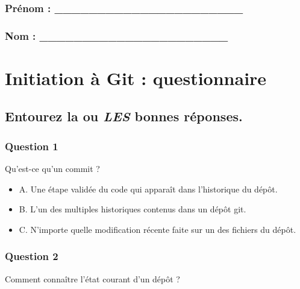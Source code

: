 \documentclass[]{article}
\date{}
\providecommand{\tightlist}{%
  \setlength{\itemsep}{0pt}\setlength{\parskip}{0pt}}
\begin{document}
\hypertarget{pruxe9nom-______________________}{%
\subsubsection{Prénom :
\_\_\_\_\_\_\_\_\_\_\_\_\_\_\_\_\_\_\_\_\_\_}\label{pruxe9nom-______________________}}

\hypertarget{nom-______________________}{%
\subsubsection{Nom :
\_\_\_\_\_\_\_\_\_\_\_\_\_\_\_\_\_\_\_\_\_\_}\label{nom-______________________}}

\hypertarget{initiation-uxe0-git-questionnaire}{%
\section{Initiation à Git :
questionnaire}\label{initiation-uxe0-git-questionnaire}}

\hypertarget{entourez-la-ou-les-bonnes-ruxe9ponses.}{%
\subsection{\texorpdfstring{Entourez la ou \emph{LES} bonnes
réponses.}{Entourez la ou LES bonnes réponses.}}\label{entourez-la-ou-les-bonnes-ruxe9ponses.}}

\hypertarget{question-1}{%
\subsubsection{Question 1}\label{question-1}}

Qu'est-ce qu'un commit ?

\begin{itemize}
\tightlist
\item
  A. Une étape validée du code qui apparaît dans l'historique du dépôt.
\item
  B. L'un des multiples historiques contenus dans un dépôt git.
\item
  C. N'importe quelle modification récente faite sur un des fichiers du
  dépôt.
\end{itemize}

\hypertarget{question-2}{%
\subsubsection{Question 2}\label{question-2}}

Comment connaître l'état courant d'un dépôt ?
\end{document}
